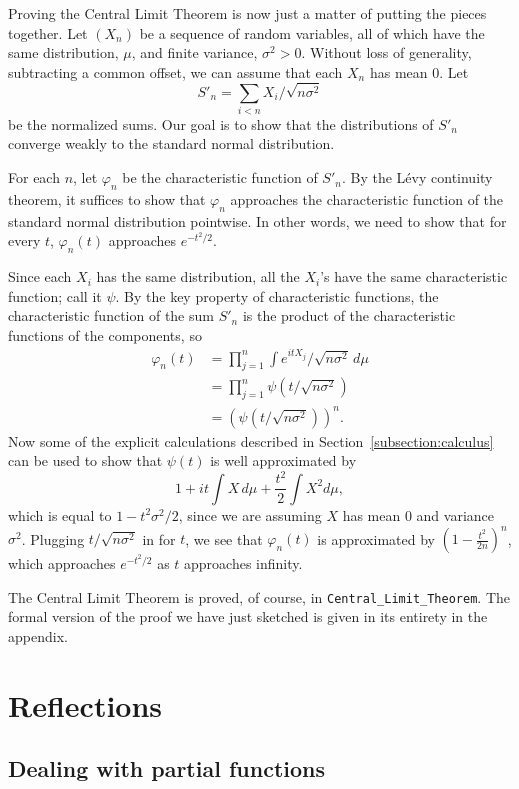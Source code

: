\documentclass{svjour3}
\newcommand{\ph}{\varphi}
\begin{document}
Proving the Central Limit Theorem is now just a matter of putting the pieces together. Let $(X_n)$ be a sequence of random variables, all of which have the same distribution, $\mu$, and finite variance, $\sigma^2 > 0$. Without loss of generality, subtracting a common offset, we can assume that each $X_n$ has mean $0$. Let
\[
 S'_n = \sum_{i < n} X_i / \sqrt {n \sigma^2}
\]
be the normalized sums. Our goal is to show that the distributions of $S'_n$ converge weakly to the standard normal distribution. 

For each $n$, let $\ph_n$ be the characteristic function of $S'_n$. By the L\'evy continuity theorem, it suffices to show that $\ph_n$ approaches the characteristic function of the standard normal distribution pointwise. In other words, we need to show that for every $t$, $\ph_n(t)$ approaches $e^{-t^2/2}$.

Since each $X_i$ has the same distribution, all the $X_i$'s have the same characteristic function; call it $\psi$. By the key property of characteristic functions, the characteristic function of the sum $S'_n$ is the product of the characteristic functions of the components, so
\begin{align*}
 \ph_n(t) & = \prod_{j = 1}^n \int e^{itX_j} / \sqrt{n \sigma^2} \, d\mu \\
   & = \prod_{j = 1}^n \psi(t / \sqrt{n \sigma^2}) \\
   & = (\psi(t / \sqrt{n \sigma^2}))^n.
\end{align*}
Now some of the explicit calculations described in Section~\ref{subsection:calculus} can be used to show that $\psi(t)$ is well approximated by
\[
1 + it \int X \, d\mu + \frac{t^2}{2} \int X^2 d\mu, 
\]
which is equal to $1 - t^2\sigma^2 / 2$, since we are assuming $X$ has mean $0$ and variance $\sigma^2$. Plugging $t / \sqrt{n \sigma^2}$ in for $t$, we see that $\ph_n(t)$ is approximated by $(1 - \frac{t^2}{2n})^n$, which approaches $e^{-t^2/2}$ as $t$ approaches infinity.

The Central Limit Theorem is proved, of course, in \verb=Central_Limit_Theorem=. The formal version of the proof we have just sketched is given in its entirety in the appendix. 

\section{Reflections}
\label{section:reflections}

\subsection{Dealing with partial functions}
\end{document}
